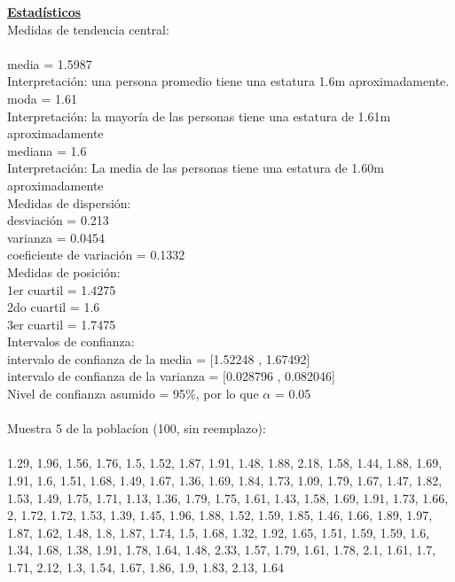 \documentclass[a4paper,12pt]{article}
\begin{document}
\begin{enumerate}
\textbf{\underline{Estad\'isticos}} \\

Medidas de tendencia central:\\\\
media =  1.5987\\
Interpretaci\'on: una persona promedio tiene una estatura 1.6m aproximadamente.\\
moda =  1.61\\
Interpretaci\'on: la mayor\'ia de las personas tiene una estatura de 1.61m aproximadamente\\
mediana =  1.6\\
Interpretación: La media de las personas tiene una estatura de 1.60m aproximadamente\\

Medidas de dispersi\'on:\\
desviaci\'on = 0.213\\
varianza = 0.0454\\
coeficiente de variaci\'on = 0.1332\\

Medidas de posici\'on:\\
1er cuartil = 1.4275\\
2do cuartil = 1.6\\
3er cuartil = 1.7475\\

Intervalos de confianza:\\
intervalo de confianza de la media = [1.52248 ,  1.67492]\\
intervalo de confianza de la varianza = [0.028796 ,  0.082046]\\
Nivel de confianza asumido = 95$\%$, por lo que $\alpha$ = 0.05\\\\

Muestra 5 de la poblac\'ion (100, sin reemplazo): \\\\
1.29,	1.96,	1.56,	1.76,	1.5,    1.52,
1.87,	1.91,	1.48,	1.88,	2.18,	1.58,
1.44,	1.88,	1.69,	1.91,	1.6,    1.51,
1.68,	1.49,	1.67,	1.36,	1.69,	1.84,
1.73,	1.09,	1.79,	1.67,	1.47,	1.82,
1.53,	1.49,	1.75,	1.71,	1.13,	1.36,
1.79,	1.75,	1.61,	1.43,	1.58,	1.69,
1.91,	1.73,	1.66,	2,      1.72,	1.72,
1.53,	1.39,	1.45,	1.96,	1.88,	1.52,
1.59,	1.85,	1.46,	1.66,	1.89,	1.97,
1.87,	1.62,	1.48,	1.8,    1.87,	1.74,
1.5,    1.68,	1.32,	1.92,	1.65,	1.51,
1.59,	1.59,	1.6,    1.34,	1.68,	1.38,
1.91,	1.78,	1.64,	1.48,	2.33,	1.57,
1.79,	1.61,	1.78,	2.1,    1.61,	1.7,
1.71,	2.12,	1.3,    1.54,	1.67,	1.86,
1.9,    1.83,	2.13,	1.64


\end{enumerate}
\end{document}
